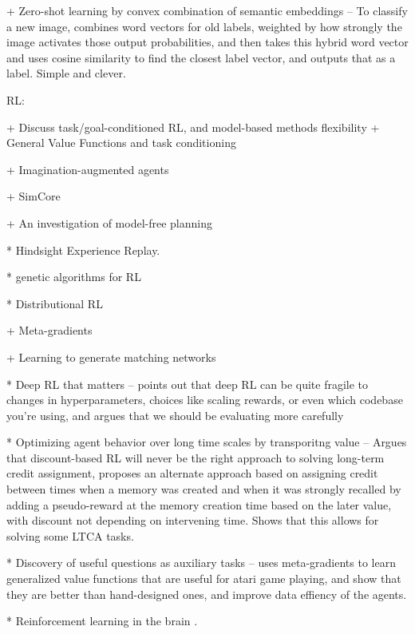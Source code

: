 + Zero-shot learning by convex combination of semantic embeddings -- To classify a new image, combines word vectors for old labels, weighted by how strongly the image activates those output probabilities, and then takes this hybrid word vector and uses cosine similarity to find the closest label vector, and outputs that as a label. Simple and clever. \citep{Norouzi2014}



RL:

+ Discuss task/goal-conditioned RL, and model-based methods flexibility
    + General Value Functions and task conditioning \citep{Sutton2011}

+ Imagination-augmented agents \citep{Racaniere2017}

+ SimCore

+ An investigation of model-free planning \citep{Guez2019}

* Hindsight Experience Replay. \citep{Andrychowicz2017}

* genetic algorithms for RL \citep{Petroski2018}

* Distributional RL \citep{Bellemare2017}

+ Meta-gradients \citep{Xu2018a}

+ Learning to generate matching networks \citep{Li2019a}

* Deep RL that matters -- points out that deep RL can be quite fragile to changes in hyperparameters, choices like scaling rewards, or even which codebase you're using, and argues that we should be evaluating more carefully \citep{Henderson2018}

* Optimizing agent behavior over long time scales by transporitng value -- Argues that discount-based RL will never be the right approach to solving long-term credit assignment, proposes an alternate approach based on assigning credit between times when a memory was created and when it was strongly recalled by adding a pseudo-reward at the memory creation time based on the later value, with discount not depending on intervening time. Shows that this allows for solving some LTCA tasks. \citep{Hung2019}

* Discovery of useful questions as auxiliary tasks -- uses meta-gradients to learn generalized value functions that are useful for atari game playing, and show that they are better than hand-designed ones, and improve data effiency of the agents. \citep{Veeriah2019}

* Reinforcement learning in the brain \citep{Niv2009}.

